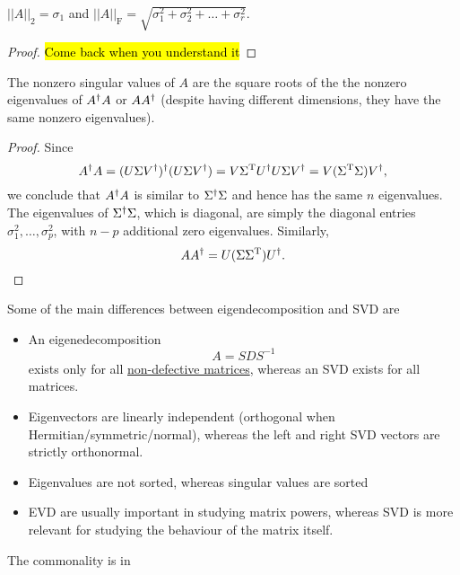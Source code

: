 \documentclass{article}
\begin{document}
\begin{theorem}
\label{theo:norm-and-singval}
$||A||_2=\sigma_1$ and $||A||_{\mathrm{F}}=\sqrt{\sigma_1^2+\sigma_2^2+\dots+\sigma_r^2}$.
\end{theorem}
\begin{proof}
    \hl{Come back when you understand it}\cite[p. 34]{trefethenNumericalLinearAlgebra2022}
\end{proof}

\begin{theorem}
    The nonzero singular values of $A$ are the square roots of the the nonzero eigenvalues of $A^{\dagger} A$ or $AA^{\dagger}$ (despite having different dimensions, they have the same nonzero eigenvalues). 
\end{theorem}
\begin{proof}
    Since
    \begin{equation}
        A^{\dagger} A=(U\Sigma V^{\dagger})^{\dagger}(U\Sigma V^{\dagger})=V\Sigma^{\text{T}} U^{\dagger} U\Sigma V^{\dagger}=V(\Sigma^{\text{T}}\Sigma)V^{\dagger},
    \end{equation}
    we conclude that $A^{\dagger} A$ is similar to $\Sigma^{\dagger}\Sigma$ and hence has the same $n$ eigenvalues. The eigenvalues of $\Sigma^{\dagger}\Sigma$, which is diagonal, are simply the diagonal entries $\sigma_1^2,\dots,\sigma_p^2$, with $n-p$ additional zero eigenvalues. Similarly,
    \begin{equation}
        AA^{\dagger}=U(\Sigma\Sigma^{\text{T}}) U^{\dagger}.
    \end{equation}
\end{proof}
Some of the main differences between eigendecomposition and SVD are
\begin{itemize}
    \item An eigenedecomposition 
    \begin{equation}
        A = SDS^{-1}
    \end{equation}
    exists only for all \href{https://en.wikipedia.org/wiki/Defective_matrix}{non-defective matrices}, whereas an SVD exists for all matrices.
    \item Eigenvectors are linearly independent (orthogonal when Hermitian/symmetric/normal), whereas the left and right SVD vectors are strictly orthonormal.
    \item Eigenvalues are not sorted, whereas singular values are sorted
    \item EVD are usually important in studying matrix powers, whereas SVD is more relevant for studying the behaviour of the matrix itself.
    \end{itemize}
The commonality is in
\end{document}
